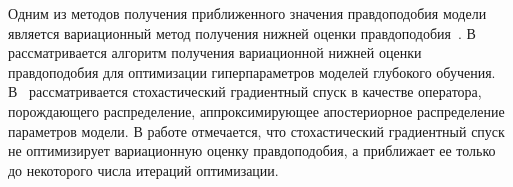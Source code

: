 \documentclass[12pt]{a&t}
\begin{document}

Одним из методов получения приближенного значения правдоподобия модели является вариационный метод получения нижней оценки правдоподобия~\cite{Bishop}. %
В~\cite{nips} рассматривается алгоритм получения вариационной нижней оценки правдоподобия  для оптимизации гиперпараметров моделей глубокого обучения. 
В~\cite{early} рассматривается стохастический градиентный спуск в качестве оператора, порождающего распределение, аппроксимирующее апостериорное распределение параметров модели. В работе отмечается, что стохастический градиентный спуск не оптимизирует вариационную оценку правдоподобия, а приближает ее только до некоторого числа итераций оптимизации. 
\end{document}
